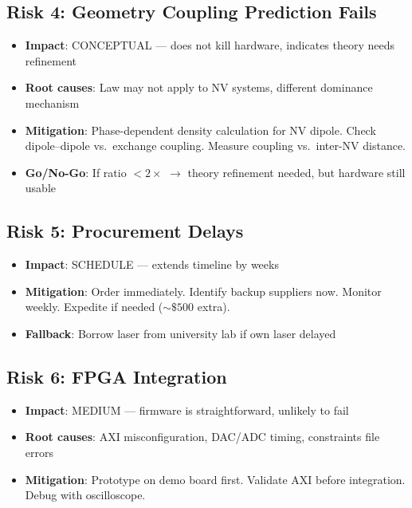 \documentclass[11pt,a4paper,openany]{book}
\begin{document}
\subsection{Risk 4: Geometry Coupling Prediction Fails}

\begin{itemize}[nosep]
  \item \textbf{Impact}: CONCEPTUAL --- does not kill hardware, indicates theory needs refinement
  \item \textbf{Root causes}: Law may not apply to NV systems, different dominance mechanism
  \item \textbf{Mitigation}: Phase-dependent density calculation for NV dipole. Check dipole--dipole vs.\ exchange coupling. Measure coupling vs.\ inter-NV distance.
  \item \textbf{Go/No-Go}: If ratio $< 2\times$ $\to$ theory refinement needed, but hardware still usable
\end{itemize}

\subsection{Risk 5: Procurement Delays}

\begin{itemize}[nosep]
  \item \textbf{Impact}: SCHEDULE --- extends timeline by weeks
  \item \textbf{Mitigation}: Order immediately. Identify backup suppliers now. Monitor weekly. Expedite if needed (${\sim}\$500$ extra).
  \item \textbf{Fallback}: Borrow laser from university lab if own laser delayed
\end{itemize}

\subsection{Risk 6: FPGA Integration}

\begin{itemize}[nosep]
  \item \textbf{Impact}: MEDIUM --- firmware is straightforward, unlikely to fail
  \item \textbf{Root causes}: AXI misconfiguration, DAC/ADC timing, constraints file errors
  \item \textbf{Mitigation}: Prototype on demo board first. Validate AXI before integration. Debug with oscilloscope.
\end{itemize}
\end{document}

